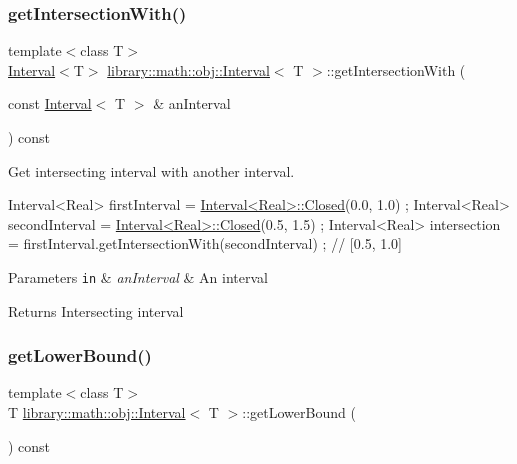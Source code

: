\subsubsection{\texorpdfstring{get\+Intersection\+With()}{getIntersectionWith()}}
{\footnotesize\ttfamily template$<$class T$>$ \\
\hyperlink{classlibrary_1_1math_1_1obj_1_1_interval}{Interval}$<$T$>$ \hyperlink{classlibrary_1_1math_1_1obj_1_1_interval}{library\+::math\+::obj\+::\+Interval}$<$ T $>$\+::get\+Intersection\+With (\begin{DoxyParamCaption}\item[{const \hyperlink{classlibrary_1_1math_1_1obj_1_1_interval}{Interval}$<$ T $>$ \&}]{an\+Interval }\end{DoxyParamCaption}) const}



Get intersecting interval with another interval. 


\begin{DoxyCode}
Interval<Real> firstInterval = \hyperlink{classlibrary_1_1math_1_1obj_1_1_interval_aae8bb2b89af450729338d48563def4d7}{Interval<Real>::Closed}(0.0, 1.0) ;
Interval<Real> secondInterval = \hyperlink{classlibrary_1_1math_1_1obj_1_1_interval_aae8bb2b89af450729338d48563def4d7}{Interval<Real>::Closed}(0.5, 1.5) ;
Interval<Real> intersection = firstInterval.getIntersectionWith(secondInterval) ; \textcolor{comment}{// [0.5, 1.0]}
\end{DoxyCode}



\begin{DoxyParams}[1]{Parameters}
\mbox{\tt in}  & {\em an\+Interval} & An interval \\
\hline
\end{DoxyParams}
\begin{DoxyReturn}{Returns}
Intersecting interval 
\end{DoxyReturn}
\mbox{\label{classlibrary_1_1math_1_1obj_1_1_interval_a4e01721016dd02dddc93fb012ff7d5b3}} 
\subsubsection{\texorpdfstring{get\+Lower\+Bound()}{getLowerBound()}}
{\footnotesize\ttfamily template$<$class T$>$ \\
T \hyperlink{classlibrary_1_1math_1_1obj_1_1_interval}{library\+::math\+::obj\+::\+Interval}$<$ T $>$\+::get\+Lower\+Bound (\begin{DoxyParamCaption}{ }\end{DoxyParamCaption}) const}



